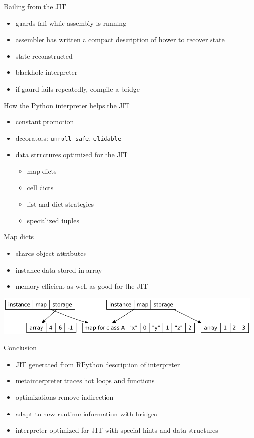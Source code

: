 \documentclass[14pt]{beamer}
\begin{document}
\begin{frame}{Bailing from the JIT}
\begin{itemize}
\item guards fail while assembly is running
\item assembler has written a compact description of hower to recover state
\item state reconstructed
\item blackhole interpreter
\item if gaurd fails repeatedly, compile a bridge
\end{itemize}
\end{frame}

\begin{frame}[fragile]{How the Python interpreter helps the JIT}
\begin{itemize}
\item constant promotion
\item decorators: \verb+unroll_safe+, \verb+elidable+
\item data structures optimized for the JIT
\begin{itemize}
\item map dicts
\item cell dicts
\item list and dict strategies
\item specialized tuples
\end{itemize}
\end{itemize}
\end{frame}

\begin{frame}{Map dicts}
\begin{itemize}
\item shares object attributes
\item instance data stored in array
\item memory efficient as well as good for the JIT
\end{itemize}
\includegraphics[scale=.45]{instancemap.png}
\end{frame}

\begin{frame}{Conclusion}
\begin{itemize}
\item JIT generated from RPython description of interpreter
\item metainterpreter traces hot loops and functions
\item optimizations remove indirection
\item adapt to new runtime information with bridges
\item interpreter optimized for JIT with special hints and data structures
\end{itemize}
\end{frame}
\end{document}
